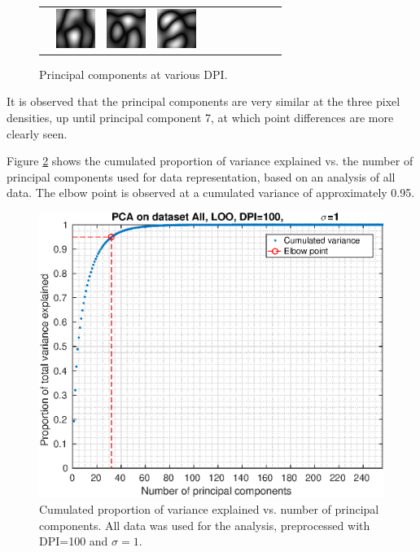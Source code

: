 \begin{figure}[h]
\begin{tabular}{r*{10}{c}}
 & \includegraphics[width=\smallfigscale]{img/pca-All-dpi300-sigma4-pc8} 
 & \includegraphics[width=\smallfigscale]{img/pca-All-dpi300-sigma4-pc9} 
 & \includegraphics[width=\smallfigscale]{img/pca-All-dpi300-sigma4-pc10} 
\end{tabular}
\caption[Principal components at various DPI.]
{Principal components at various DPI.}
\label{fig:principal-components}
\end{figure}

It is observed that the principal components are very similar
at the three pixel densities, up until principal component 7,
at which point differences are more clearly seen.

Figure \ref{fig:pca-cumvar} shows the cumulated proportion of variance
explained vs. the number of principal components used for data representation,
based on an analysis of all data.
The elbow point is observed at a cumulated variance of approximately 0.95.
\begin{figure}[h]
\centering
\includegraphics[width=\figscale]{img/pca-All-cumvar-dpi100-sigma1}
\caption[Cumulated variance explained by PCA]
{Cumulated proportion of variance explained vs. number of principal components.
All data was used for the analysis, preprocessed with DPI=100 and \(\sigma=1\).}
\label{fig:pca-cumvar}
\end{figure}

